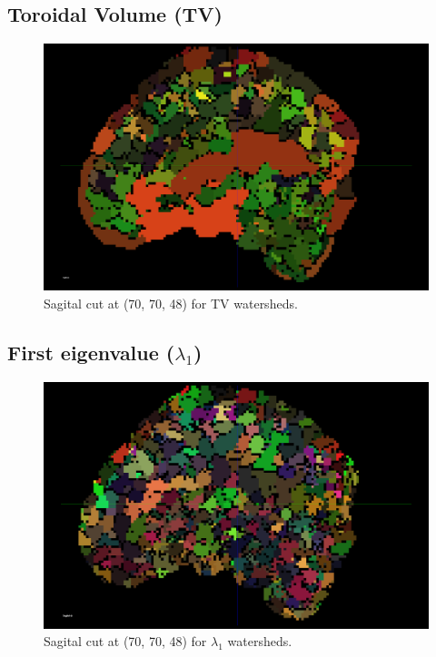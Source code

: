 \documentclass[a4paper,11pt]{report}
\begin{document}
    \subsection{Toroidal Volume (TV)}
    \begin{figure}[H]
      \includegraphics[width=1\linewidth]{imgs/tv_watersheds.png}
      \caption{Sagital cut at (70, 70, 48) for TV watersheds.}
      \label{fig:tv_watersheds}
    \end{figure}

    \subsection{First eigenvalue ($\lambda_1$)}
    \begin{figure}[H]
      \includegraphics[width=1\linewidth]{imgs/e1_watersheds.png}
      \caption{Sagital cut at (70, 70, 48) for $\lambda_1$ watersheds.}
      \label{fig:e1_watersheds}
    \end{figure}
\end{document}
